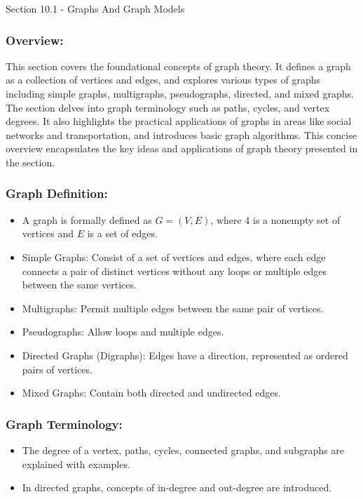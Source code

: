 \begin{notes}{Section 10.1 - Graphs And Graph Models}
    \subsubsection*{Overview:}

    This section covers the foundational concepts of graph theory. It defines a graph as a collection of vertices and edges, and explores various types of graphs including simple graphs, multigraphs, 
    pseudographs, directed, and mixed graphs. The section delves into graph terminology such as paths, cycles, and vertex degrees. It also highlights the practical applications of graphs in areas like 
    social networks and transportation, and introduces basic graph algorithms. This concise overview encapsulates the key ideas and applications of graph theory presented in the section. \vspace*{1em}

    \subsubsection*{Graph Definition:}

    \begin{itemize}
        \item A graph is formally defined as $G=(V,E)$, where 4 is a nonempty set of vertices and $E$ is a set of edges.
        \item Simple Graphs: Consist of a set of vertices and edges, where each edge connects a pair of distinct vertices without any loops or multiple edges between the same vertices.
        \item Multigraphs: Permit multiple edges between the same pair of vertices.
        \item Pseudographs: Allow loops and multiple edges.
        \item Directed Graphs (Digraphs): Edges have a direction, represented as ordered pairs of vertices.
        \item Mixed Graphs: Contain both directed and undirected edges.
    \end{itemize}

    \subsubsection*{Graph Terminology:}

    \begin{itemize}
        \item The degree of a vertex, paths, cycles, connected graphs, and subgraphs are explained with examples.
        \item In directed graphs, concepts of in-degree and out-degree are introduced.
    \end{itemize}


\end{notes}
